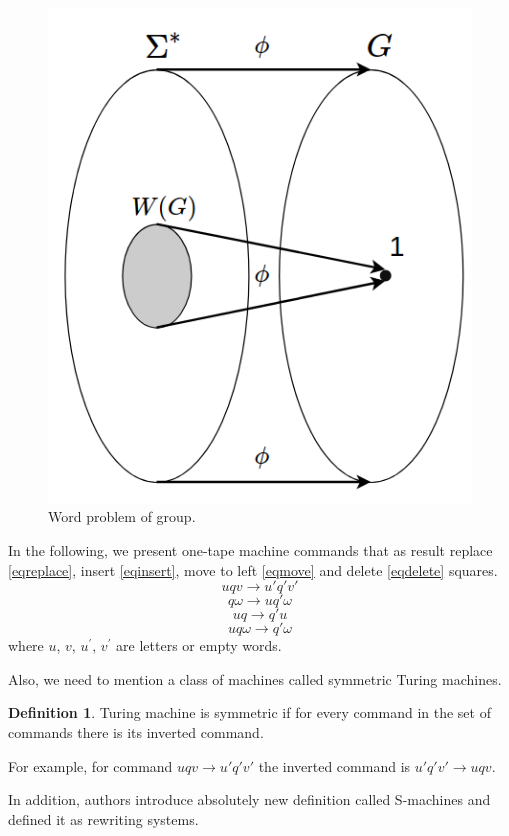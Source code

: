 \documentclass[conference]{IEEEtran}
\theoremstyle{definition}
\newtheorem{defn}{Definition}[section]
\begin{document}
\begin{figure}[tp]
\centerline{\includegraphics[width=0.6\linewidth]{pics/3.png}}
\caption{Word problem of group.}
\label{fig:word_problem}
\end{figure}

In the following, we present one-tape machine commands that as result replace \eqref{eqreplace},
insert \eqref{eqinsert}, move to left \eqref{eqmove} and delete \eqref{eqdelete} squares.
\begin{equation}
    u q v \to u' q' v' \label{eqreplace}
\end{equation}
\begin{equation}
    q \omega \to u q' \omega \label{eqinsert}
\end{equation}
\begin{equation}
    u q \to q' u \label{eqmove}
\end{equation}
\begin{equation}
    u q \omega \to q' \omega \label{eqdelete}
\end{equation}
where $u$, $v$, $u^'$, $v^'$ are letters or empty words.  

Also, we need to mention a class of machines called symmetric Turing machines.
\begin{defn}
Turing machine is symmetric if for every command in the set of commands there 
is its inverted command.
\end{defn}
For  example, for command 
$u q v \to u' q' v'$ the inverted command is $u' q' v' \to u q v$.

In addition, authors introduce absolutely new definition called S-machines and defined it as rewriting systems.
\end{document}
